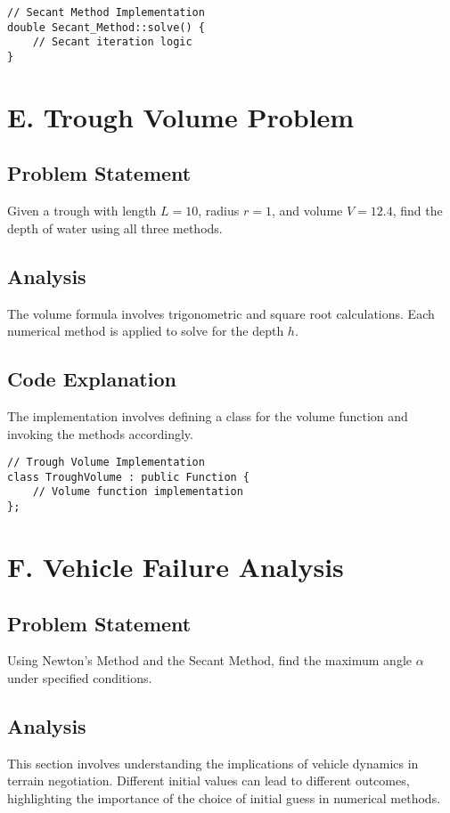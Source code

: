\documentclass{article}
\begin{document}
\begin{verbatim}
// Secant Method Implementation
double Secant_Method::solve() {
    // Secant iteration logic
}
\end{verbatim}

\section{E. Trough Volume Problem}
\subsection{Problem Statement}
Given a trough with length \( L = 10 \), radius \( r = 1 \), and volume \( V = 12.4 \), find the depth of water using all three methods.

\subsection{Analysis}
The volume formula involves trigonometric and square root calculations. Each numerical method is applied to solve for the depth \( h \).

\subsection{Code Explanation}
The implementation involves defining a class for the volume function and invoking the methods accordingly.

\begin{verbatim}
// Trough Volume Implementation
class TroughVolume : public Function {
    // Volume function implementation
};
\end{verbatim}

\section{F. Vehicle Failure Analysis}
\subsection{Problem Statement}
Using Newton’s Method and the Secant Method, find the maximum angle \( \alpha \) under specified conditions.

\subsection{Analysis}
This section involves understanding the implications of vehicle dynamics in terrain negotiation. Different initial values can lead to different outcomes, highlighting the importance of the choice of initial guess in numerical methods.
\end{document}
